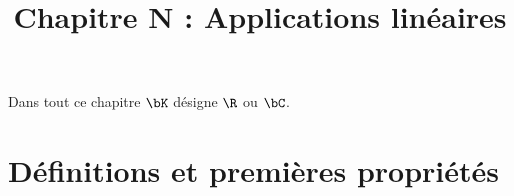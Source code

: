 \documentclass[a4paper, 11pt]{article}
\begin{document}
\tableofcontents
 \title{Chapitre N : Applications linéaires} 
\vspace{0.5cm}




\noindent Dans tout ce chapitre $\bK$ d\'esigne $\R$ ou $\bC$.
%
%
\section{D\'efinitions et premi\`{e}res propri\'et\'es}
\end{document}
